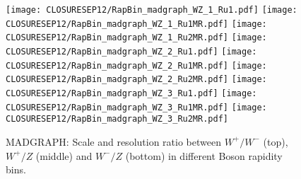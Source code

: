 \documentclass[41pt,a4paper,oneside]{report}
\begin{document}
\begin{figure}[h!]
  \begin{center}
    \texttt{[image: CLOSURESEP12/RapBin\_madgraph\_WZ\_1\_Ru1.pdf]}
    \texttt{[image: CLOSURESEP12/RapBin\_madgraph\_WZ\_1\_Ru1MR.pdf]}
    \texttt{[image: CLOSURESEP12/RapBin\_madgraph\_WZ\_1\_Ru2MR.pdf]}
    \texttt{[image: CLOSURESEP12/RapBin\_madgraph\_WZ\_2\_Ru1.pdf]}
    \texttt{[image: CLOSURESEP12/RapBin\_madgraph\_WZ\_2\_Ru1MR.pdf]}
    \texttt{[image: CLOSURESEP12/RapBin\_madgraph\_WZ\_2\_Ru2MR.pdf]}
    \texttt{[image: CLOSURESEP12/RapBin\_madgraph\_WZ\_3\_Ru1.pdf]}
    \texttt{[image: CLOSURESEP12/RapBin\_madgraph\_WZ\_3\_Ru1MR.pdf]}
    \texttt{[image: CLOSURESEP12/RapBin\_madgraph\_WZ\_3\_Ru2MR.pdf]}
    \caption{MADGRAPH: Scale and resolution ratio between $W^{+}/W^{-}$ (top), $W^{+}/Z$ (middle) and $W^{-}/Z$ (bottom) in different Boson rapidity bins. {\color{blue}{plot oder than OCT6}}}
    \label{fig:RapBinningMAD}
  \end{center}
\end{figure}
\end{document}
